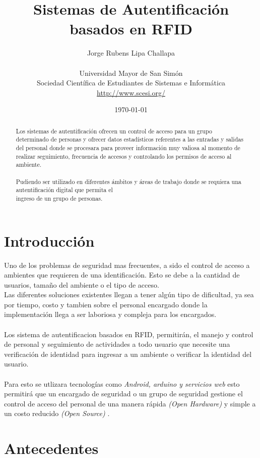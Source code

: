 \documentclass[11pt,twocolumn]{article}
\title{
\vspace{-3cm}   
Sistemas de Autentificaci\'on\\
basados en RFID
}
\author{ 
Jorge Rubens Lipa Challapa\\
\\
Universidad Mayor de San Sim\'on \\
Sociedad Cient\'ifica de Estudiantes de Sistemas e Inform\'atica\\
\url {http://www.scesi.org/}
}
\date{ \today }
\begin{document}
\maketitle

\begin{abstract} 
Los sistemas de autentificaci\'on ofrecen un control de 
acceso para un grupo determinado de personas y ofrecer datos estad\'isticos 
referentes a las entradas y salidas del personal donde se procesara para 
proveer informaci\'on muy valiosa al momento de realizar seguimiento, 
frecuencia de accesos y controlando los permisos de acceso al ambiente.\\
\\
 Pudiendo ser utilizado en diferentes \'ambitos y \'areas de
 trabajo donde se requiera una autentificaci\'on digital que permita el \\
 ingreso de un grupo de personas.
\end{abstract}

\section{Introducci\'on}
Uno de los problemas de seguridad mas frecuentes,  a sido el control de acceso 
a ambientes que requieren de una identificaci\'on. Esto se debe a  la 
cantidad de usuarios, tama\~no del ambiente o el tipo de acceso.\\ 
Las diferentes soluciones existentes llegan a tener alg\'un tipo de dificultad, 
ya sea por tiempo, costo y tambien sobre el personal encargado donde la 
implementaci\'on llega a ser laboriosa y compleja para los encargados.\\
\\
Los sistema de autentificacion basados en RFID, permitir\'an, el manejo y 
control de personal y seguimiento de actividades a todo usuario que necesite 
una verificaci\'on de identidad para ingresar a un ambiente o verificar la 
identidad del usuario.\\
\\
Para esto se utlizara tecnolog\'ias como \textit{ Android, arduino y 
servicios web} esto permitir\'a que un encargado de seguridad o un grupo de 
seguridad gestione el control de acceso del personal de una manera r\'apida 
\textit{(Open Hardware)} y simple a un costo reducido \textit{(Open Source)} .\\

\section{Antecedentes}
\end{document}
